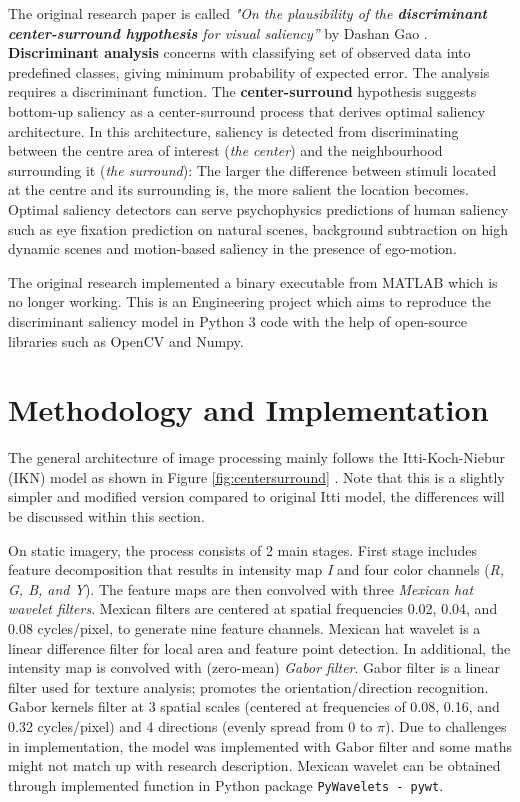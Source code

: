 \documentclass[conference]{IEEEtran}
\begin{document}
The original research paper is called  \textit{"On the plausibility of the \textbf{discriminant center-surround hypothesis} for visual saliency”} by Dashan Gao \cite{Gao_Vasconcelos_2008}. \textbf{Discriminant analysis} concerns with classifying set of observed data into predefined classes, giving minimum probability of expected error. The analysis requires a discriminant function. The \textbf{center-surround} hypothesis suggests bottom-up saliency as a center-surround process that derives optimal saliency architecture. In this architecture, saliency is detected from discriminating between the centre area of interest (\textit{the center}) and the neighbourhood surrounding it (\textit{the surround}): The larger the difference between stimuli located at the centre and its surrounding is, the more salient the location becomes. Optimal saliency detectors can serve psychophysics predictions of human saliency such as eye fixation prediction on natural scenes, background subtraction on high dynamic scenes and motion-based saliency in the presence of ego-motion. 

The original research implemented a binary executable from MATLAB which is no longer working. This is an Engineering project which aims to reproduce the discriminant saliency model in Python 3 code with the help of open-source libraries such as OpenCV and Numpy.

\section{Methodology and Implementation}
The general architecture of image processing mainly follows the Itti-Koch-Niebur (IKN) model as shown in Figure \ref{fig:centersurround} \cite{Xu_2008}. Note that this is a slightly simpler and modified version compared to original Itti model, the differences will be discussed within this section.

On static imagery, the process consists of 2 main stages. First stage includes feature decomposition that results in intensity map \textit{I} and four color channels (\textit{R, G, B, and Y}). The feature maps are then convolved with three \textit{Mexican hat wavelet filters}. Mexican filters are centered at spatial frequencies 0.02, 0.04, and 0.08 cycles/pixel, to generate nine feature channels. Mexican hat wavelet is a linear difference filter for local area and feature point detection. In additional, the intensity map is convolved with (zero-mean) \textit{Gabor filter}. Gabor filter is a linear filter used for texture analysis; promotes the orientation/direction recognition. Gabor kernels filter at 3 spatial scales (centered at frequencies of 0.08, 0.16, and 0.32 cycles/pixel) and 4 directions (evenly spread from 0 to $\pi$). Due to challenges in implementation, the model was implemented with Gabor filter and some maths might not match up with research description. Mexican wavelet can be obtained through implemented function in Python package \texttt{PyWavelets - pywt}.
\end{document}

